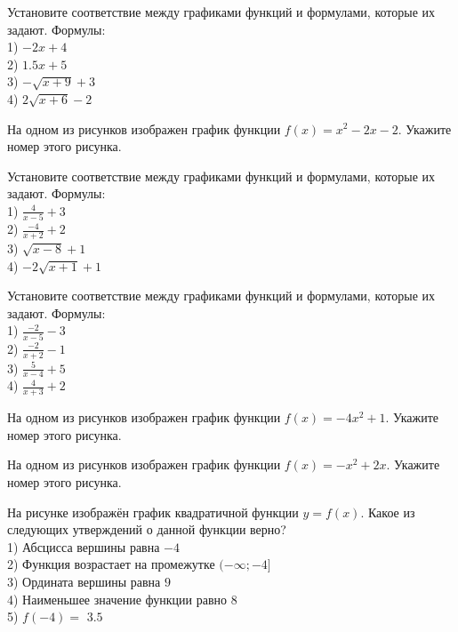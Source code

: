 \documentclass[4apaper]{article}
\begin{document}
\begin{taskBN}{87}
Установите соответствие между графиками функций и формулами, которые их задают. Формулы: \\1) $-2x+4$\\2) $1.5x+5$\\3) $-\sqrt{x+9}+3$\\4) $2\sqrt{x+6}-2$
\end{taskBN}

\begin{taskBN}{88}
На одном из рисунков изображен график функции $f(x)=x^2-2x-2$. Укажите номер этого рисунка.
\end{taskBN}

\begin{taskBN}{89}
Установите соответствие между графиками функций и формулами, которые их задают. Формулы: \\1) $\frac{4}{x-5}+3$\\2) $\frac{-4}{x+2}+2$\\3) $\sqrt{x-8}+1$\\4) $-2\sqrt{x+1}+1$
\end{taskBN}

\begin{taskBN}{90}
Установите соответствие между графиками функций и формулами, которые их задают. Формулы: \\1) $\frac{-2}{x-5}-3$\\2) $\frac{-2}{x+2}-1$\\3) $\frac{5}{x-4}+5$\\4) $\frac{4}{x+3}+2$
\end{taskBN}

\begin{taskBN}{91}
На одном из рисунков изображен график функции $f(x)=-4x^2+1$. Укажите номер этого рисунка.
\end{taskBN}

\begin{taskBN}{92}
На одном из рисунков изображен график функции $f(x)=-x^2+2x$. Укажите номер этого рисунка.
\end{taskBN}

\begin{taskBN}{93}
На рисунке изображён график квадратичной функции $y=f(x)$. Какое из следующих утверждений о данной функции верно?\\1) Абсцисса вершины равна $-4$\\2) Функция возрастает на промежутке $(-\infty;-4]$\\3) Ордината вершины равна $9$\\4) Наименьшее значение функции равно  $8$\\5) $f(-4)=$ $3.5$
\end{taskBN}
\end{document}
